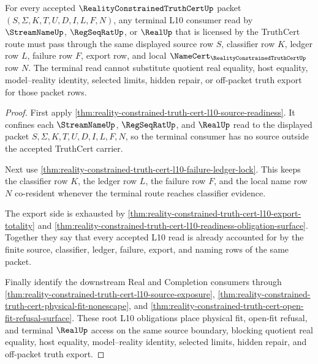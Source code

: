 \begin{theorem}
\label{thm:reality-constrained-truth-cert-l10-terminal-source-boundary}
For every accepted $\RealityConstrainedTruthCertUp$ packet
$(S,\Sigma,K,T,U,D,I,L,F,N)$, any terminal L10 consumer read by
$\StreamNameUp$, $\RegSeqRatUp$, or $\RealUp$ that is licensed by the TruthCert
route must pass through the same displayed source row $S$, classifier row $K$,
ledger row $L$, failure row $F$, export row, and local
$\NameCert_{\RealityConstrainedTruthCertUp}$ row $N$. The terminal read cannot
substitute quotient real equality, host equality, model--reality identity,
selected limits, hidden repair, or off-packet truth export for those packet
rows.
\end{theorem}
\begin{proof}
First apply
\autoref{thm:reality-constrained-truth-cert-l10-source-readiness}. It confines
each $\StreamNameUp$, $\RegSeqRatUp$, and $\RealUp$ read to the displayed packet
$S,\Sigma,K,T,U,D,I,L,F,N$, so the terminal consumer has no source outside the
accepted TruthCert carrier.

Next use
\autoref{thm:reality-constrained-truth-cert-l10-failure-ledger-lock}. This keeps
the classifier row $K$, the ledger row $L$, the failure row $F$, and the local
name row $N$ co-resident whenever the terminal route reaches classifier
evidence.

The export side is exhausted by
\autoref{thm:reality-constrained-truth-cert-l10-export-totality} and
\autoref{thm:reality-constrained-truth-cert-l10-readiness-obligation-surface}.
Together they say that every accepted L10 read is already accounted for by the
finite source, classifier, ledger, failure, export, and naming rows of the same
packet.

Finally identify the downstream Real and Completion consumers through
\autoref{thm:reality-constrained-truth-cert-l10-source-exposure},
\autoref{thm:reality-constrained-truth-cert-physical-fit-nonescape}, and
\autoref{thm:reality-constrained-truth-cert-open-fit-refusal-surface}. These
root L10 obligations place physical fit, open-fit refusal, and terminal
$\RealUp$ access on the same source boundary, blocking quotient real equality,
host equality, model--reality identity, selected limits, hidden repair, and
off-packet truth export.
\end{proof}


